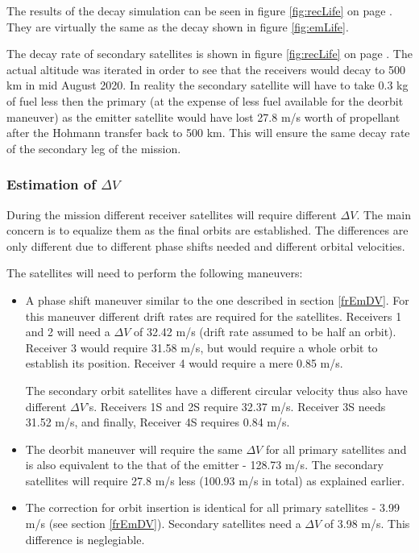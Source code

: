 The results of the decay simulation can be seen in figure \ref{fig:recLife} on page \pageref{fig:recLife}. They are virtually the same as the decay shown in figure \ref{fig:emLife}.

The decay rate of secondary satellites is shown in figure \ref{fig:recLife} on page \pageref{fig:recLife}. The actual altitude was iterated in order to see that the receivers would decay to 500 km in mid August 2020. In reality the secondary satellite will have to take 0.3 kg of fuel less then the primary (at the expense of less fuel available for the deorbit maneuver) as the emitter satellite would have lost 27.8 m/s worth of propellant after the Hohmann transfer back to 500 km. This will ensure the same decay rate of the secondary leg of the mission.    


\subsubsection{Estimation of $\Delta V$}
\label{frRecDV}

During the mission different receiver satellites will require different $\Delta V$. The main concern is to equalize them as the final orbits are established. The differences are only different due to different phase shifts needed and different orbital velocities.

The satellites will need to perform the following maneuvers:

\begin{itemize}
	\item A phase shift maneuver similar to the one described in section \ref{frEmDV}. For this maneuver different drift rates are required for the satellites. Receivers 1 and 2 will need a $\Delta V$ of 32.42 m/s (drift rate assumed to be half an orbit). Receiver 3 would require 31.58 m/s, but would require a whole orbit to establish its position. Receiver 4 would require a mere 0.85 m/s.
	
	The secondary orbit satellites have a different circular velocity thus also have different $\Delta V$'s. Receivers 1S and 2S require 32.37 m/s. Receiver 3S needs 31.52 m/s, and finally, Receiver 4S requires 0.84 m/s.
	\item The deorbit maneuver will require the same $\Delta V$ for all primary satellites and is also equivalent to the that of the emitter - 128.73 m/s. The secondary satellites will require 27.8 m/s less (100.93 m/s in total) as explained earlier.
	\item The correction for orbit insertion is identical for all primary satellites - 3.99 m/s (see section \ref{frEmDV}). Secondary satellites need a $\Delta V$ of 3.98 m/s. This difference is neglegiable.  
\end{itemize}

